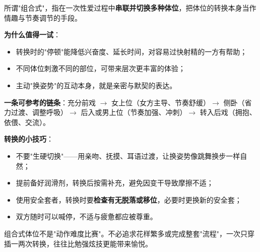 所谓"组合式"，指在一次性爱过程中\textbf{串联并切换多种体位}，把体位的转换本身当作情趣与节奏调节的手段。

\noindent\textbf{为什么值得一试}：
\begin{itemize}
	\item 转换时的"停顿"能降低兴奋度、延长时间，对容易过快射精的一方有帮助；
	\item 不同体位刺激不同的部位，可带来层次更丰富的体验；
	\item 主动"换姿势"的互动本身，就是亲密与默契的表达。
\end{itemize}

\noindent\textbf{一条可参考的链条}：充分前戏 $\rightarrow$ 女上位（女方主导、节奏舒缓）$\rightarrow$ 侧卧（省力过渡、调整呼吸）$\rightarrow$ 后入或男上位（节奏加强、冲刺）$\rightarrow$ 转入后戏（拥抱、依偎、交流）。

\noindent\textbf{转换的小技巧}：
\begin{itemize}
	\item 不要"生硬切换"——用亲吻、抚摸、耳语过渡，让换姿势像跳舞换步一样自然；
	\item 提前备好润滑剂，转换后按需补充，避免因变干导致摩擦不适；
	\item 使用安全套者，转换时要\textbf{检查有无脱落或移位}，必要时更换新的安全套；
	\item 双方随时可以喊停，不适与疲惫都应被尊重。
\end{itemize}

\begin{tcolorbox}[colback=pink!5!white,colframe=red!50!black,title=贴心小叮咛]
组合式体位不是"动作难度比赛"。不必追求花样繁多或完成整套"流程"，一次只穿插一两次转换，往往比勉强炫技更能带来愉悦。
\end{tcolorbox}

